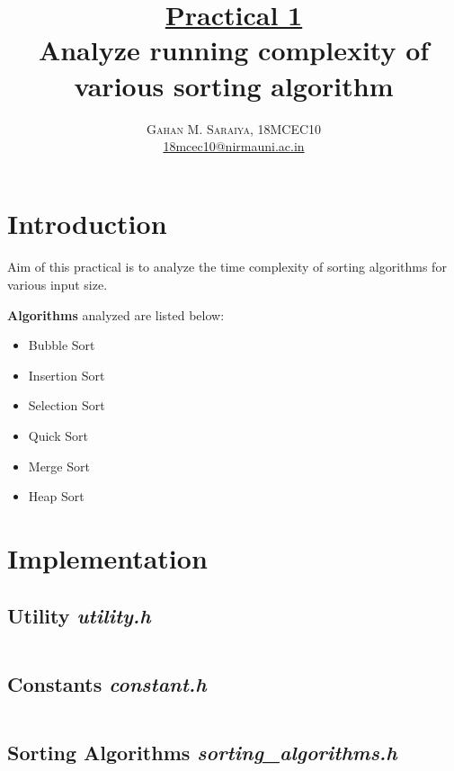 \documentclass[paper=letter, fontsize=12pt]{article}
\title{\vspace{-15mm}\fontsize{24pt}{10pt}\selectfont\textbf{
		\underline{Practical 1}\\Analyze running complexity of various sorting algorithm}} %
\author{\large{\textsc{
		Gahan M. Saraiya, 18MCEC10 }}\\[2mm]
\normalsize \href{mailto:18mcec10@nirmauni.ac.in}{18mcec10@nirmauni.ac.in}\\[2mm] %
}
\date{}
\begin{document}
\maketitle %
\thispagestyle{fancy} %

\newcommand*\tick{\item[\Checkmark]}
\newcommand*\arrow{\item[$\Rightarrow$]}
\newcommand*\fail{\item[\XSolidBrush]}

\section{Introduction}
\paragraph{}
Aim of this practical is to analyze the time complexity of sorting algorithms for various input size.

\textbf{Algorithms} analyzed are listed below:
\begin{itemize}
	\item Bubble Sort
	\item Insertion Sort
	\item Selection Sort
	\item Quick Sort
	\item Merge Sort
	\item Heap Sort
\end{itemize}

\section{Implementation}

\subsection{Utility \textbf{\textit{utility.h}}}
\inputminted[frame=lines, breaklines, linenos]{c}{../utility.h}

\subsection{Constants \textbf{\textit{constant.h}}}
\inputminted[frame=lines, breaklines, linenos]{c}{../constant.h}

\subsection{Sorting Algorithms \textbf{\textit{sorting\_algorithms.h}}}
\inputminted[frame=lines, breaklines, linenos]{c}{../sorting_algorithms.h}
\end{document}
